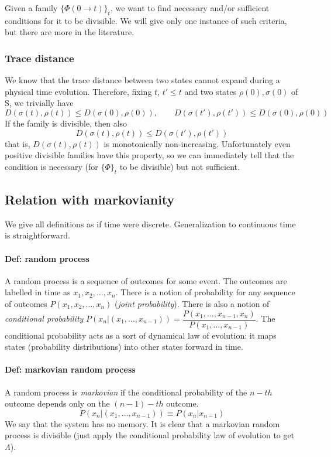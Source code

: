 \documentclass[a4paper, 11pt]{article}
\begin{document}
	Given a family $\{\Phi(0\rightarrow t)\}_t$, we want to find necessary and/or sufficient conditions for it to be divisible. We will give only one instance of such criteria, but there are more in the literature.
	\subsubsection{Trace distance}
	We know that the trace distance between two states cannot expand during a physical time evolution. Therefore, fixing $t$, $t'\le t$ and two states $\rho(0),\sigma(0)$ of S, we trivially have
	\[ D(\sigma(t), \rho(t)) \le D(\sigma(0), \rho(0)),\qquad D(\sigma(t'), \rho(t')) \le D(\sigma(0), \rho(0)) \]
	If the family is divisible, then also
	\[ D(\sigma(t), \rho(t)) \le D(\sigma(t'), \rho(t'))  \]
	that is, $D(\sigma(t), \rho(t))$ is monotonically non-increasing. Unfortunately even positive divisible families have this property, so we can immediately tell that the condition is necessary (for $\{\Phi\}_t$ to be divisible) but not sufficient.
	
	\subsection{Relation with markovianity}
	We give all definitions as if time were discrete. Generalization to continuous time is straightforward.
	\paragraph{Def: random process} A random process is a sequence of outcomes for some event. The outcomes are labelled in time as $x_1,x_2,\dots,x_n$. There is a notion of probability for any sequence of outcomes $P(x_1,x_2,\dots,x_n)$ (\emph{joint probability}). There is also a notion of \emph{conditional probability} $P(x_n|(x_1,\dots,x_{n-1})) = \dfrac{P(x_1,\dots,x_{n-1},x_n)}{P(x_1,\dots,x_{n-1})}$. The conditional probability acts as a sort of dynamical law of evolution: it maps states (probability distributions) into other states forward in time.
	
	\paragraph{Def: markovian random process} 
	A random process is \emph{markovian} if the conditional probability of the $n-th$ outcome depends only on the $(n-1)-th$ outcome.
	\[ P(x_n|(x_1,\dots,x_{n-1})) \equiv P(x_n|x_{n-1}) \]
	We say that the system has no memory. It is clear that a markovian random process is divisible (just apply the conditional probability law of evolution to get $\Lambda$).
	
\end{document}

